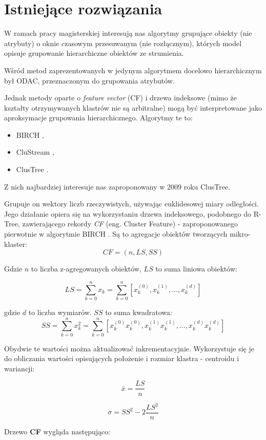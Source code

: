 \documentclass[11pt]{mgr}
\begin{document}
\chapter{Istniejące rozwiązania}
W ramach pracy magisterskiej interesują nas algorytmy grupujące obiekty (nie atrybuty) o oknie czasowym przesuwanym (nie rozłącznym), których model opisuje grupowanie hierarchiczne obiektów ze strumienia. 
\par 
Wśród metod zaprezentowanych w \cite{silva2013data} jedynym algorytmem docelowo hierarchicznym był ODAC, przeznaczonym do grupowania atrybutów. 
\par 
Jednak metody oparte o \textit{feature vector} (CF) i drzewa indeksowe (mimo że kształty otrzymywanych klastrów nie są arbitralne) mogą być interpretowane jako aproksymacje grupowania hierarchicznego. Algorytmy te to:
\begin{itemize}
\item BIRCH \cite{zhang1996birch},
\item CluStream \cite{aggarwal2003framework},
\item ClusTree \cite{kranen2009self}.
\end{itemize}
Z nich najbardziej interesuje nas zaproponowany w 2009 roku ClusTree.
\par 

Grupuje on wektory liczb rzeczywistych, używając euklidesowej miary odległości. Jego działanie opiera się na wykorzystaniu drzewa indeksowego, podobnego do R-Tree, zawierającego rekordy \emph{CF} (eng. Cluster Feature) - zaproponowanego pierwotnie w algorytmie BIRCH \cite{zhang1996birch}. Są to agregacje obiektów tworzących mikro-klaster:
\[CF = (n,LS,SS) \]

Gdzie \(n\) to liczba z-agregowanych obiektów, \(LS\) to suma liniowa obiektów:

\[LS = \sum_{k=0}^{n} x_k = \sum_{k=0}^{n} [x_k^{(0)},x_k^{(1)},...,x_k^{(d)}] \]

gdzie \(d\) to liczba wymiarów. \(SS\) to suma kwadratowa:
\[SS = \sum_{k=0}^{n} x_k^2 = \sum_{k=0}^{n} [x_k^{(0)} x_k^{(0)},x_k^{(1)} x_k^{(1)} ,..., x_k^{(d)} x_k^{(d)} ] \]

Obydwie te wartości można aktualizować inkrementacyjnie. Wykorzystuje się je do obliczania wartości opisujących położenie i rozmiar klastra - centroidu i wariancji:

\[ \bar x = \frac{LS}{n} \]

\[ \sigma = SS^2 - 2 \frac{LS^2}{n} \]

Drzewo \textbf{CF} wygląda następująco:
\end{document}
